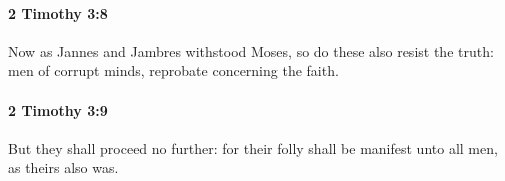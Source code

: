 		\paragraph{2 Timothy 3:8} %
			\label{2TIMOTHY-3-8}

			Now as Jannes and Jambres withstood Moses, so do these also resist the truth: men of corrupt minds, reprobate concerning the faith.

			\begin{framed}
			\scriptsize
				\begin{compactdesc}
					\item[SBLG] 
				\end{compactdesc}
			\end{framed}

		\paragraph{2 Timothy 3:9} %
			\label{2TIMOTHY-3-9}

			But they shall proceed no further: for their folly shall be manifest unto all men, as theirs also was.

